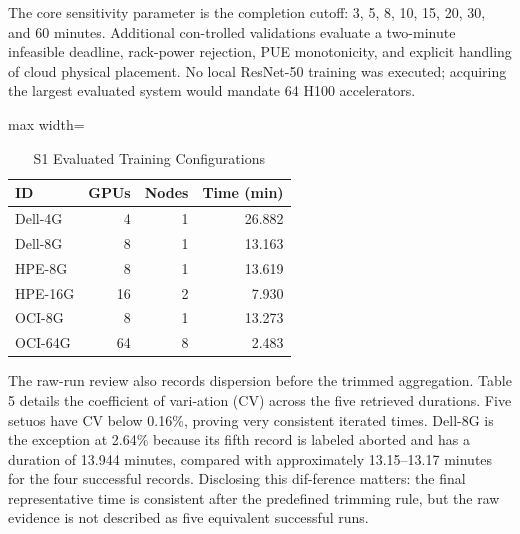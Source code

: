 \documentclass[final,3p,12pt,nopreprintline]{elsarticle}
\begin{document}
The core sensitivity parameter is the completion cutoff: 3, 5, 8, 10, 15, 20, 30, and 60 minutes. Additional con-trolled validations evaluate a two-minute infeasible deadline, rack-power rejection, PUE monotonicity, and explicit handling of cloud physical placement. No local ResNet-50 training was executed; acquiring the largest evaluated system would mandate 64 H100 accelerators.


\begin{table}[htbp]
\caption{S1 Evaluated Training Configurations}
\label{tab:s1configs}
\centering
\footnotesize
\setlength{\tabcolsep}{3pt}
\renewcommand{\arraystretch}{1.08}
\begin{adjustbox}{max width=\linewidth}
\begin{tabular}{lrrr}
\toprule
\textbf{ID} & \textbf{GPUs} & \textbf{Nodes} & \textbf{Time (min)}\\
\midrule
Dell-4G & 4 & 1 & 26.882\\
Dell-8G & 8 & 1 & 13.163\\
HPE-8G & 8 & 1 & 13.619\\
HPE-16G & 16 & 2 & 7.930\\
OCI-8G & 8 & 1 & 13.273\\
OCI-64G & 64 & 8 & 2.483\\
\bottomrule
\end{tabular}
\end{adjustbox}
\end{table}

The raw-run review also records dispersion before the trimmed aggregation. Table 5 details the coefficient of vari-ation (CV) across the five retrieved durations. Five setuos have CV below 0.16\%, proving very consistent iterated times. Dell-8G is the exception at 2.64\% because its fifth record is labeled aborted and has a duration of 13.944 minutes, compared with approximately 13.15–13.17 minutes for the four successful records. Disclosing this dif-ference matters: the final representative time is consistent after the predefined trimming rule, but the raw evidence is not described as five equivalent successful runs.
\end{document}
